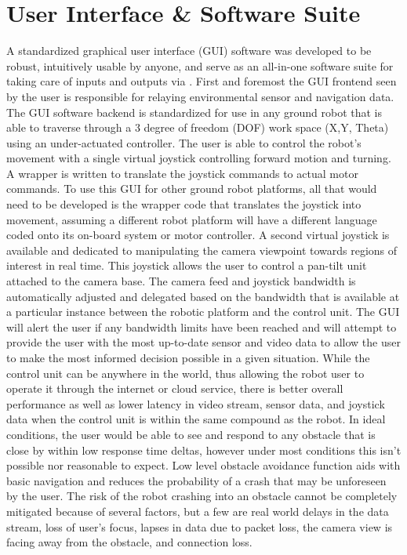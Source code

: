 \section{User Interface & Software Suite}\label{sec:ui}

A standardized graphical user interface (GUI) software was developed to be robust, intuitively usable by anyone, and serve as an all-in-one software suite for taking care of inputs and outputs via . First and foremost the GUI frontend seen by the user is responsible for relaying environmental sensor and navigation data. The GUI software backend is standardized for use in any ground robot that is able to traverse through a 3 degree of freedom (DOF) work space (X,Y, Theta) using an under-actuated controller. The user is able to control the robot's movement with a single virtual joystick controlling forward motion and turning. A wrapper is written to translate the joystick commands to actual motor commands. To use this GUI for other ground robot platforms, all that would need to be developed is the wrapper code that translates the joystick into movement, assuming a different robot platform will have a different language coded onto its on-board system or motor controller. A second virtual joystick is available and dedicated to manipulating the camera viewpoint towards regions of interest in real time. This joystick allows the user to control a pan-tilt unit attached to the camera base. The camera feed and joystick bandwidth is automatically adjusted and delegated based on the bandwidth that is available at a particular instance between the robotic platform and the control unit. The GUI will alert the user if any bandwidth limits have been reached and will attempt to provide the user with the most up-to-date sensor and video data to allow the user to make the most informed decision possible in a given situation. While the control unit can be anywhere in the world, thus allowing the robot user to operate it through the internet or cloud service, there is better overall performance as well as lower latency in video stream, sensor data, and joystick data when the control unit is within the same compound as the robot. In ideal conditions, the user would be able to see and respond to any obstacle that is close by within low response time deltas, however under most conditions this isn't possible nor reasonable to expect. Low level obstacle avoidance function aids with basic navigation and reduces the probability of a crash that may be unforeseen by the user. The risk of the robot crashing into an obstacle cannot be completely mitigated because of several factors, but a few are real world delays in the data stream, loss of user's focus, lapses in data due to packet loss, the camera view is facing away from the obstacle, and connection loss.


